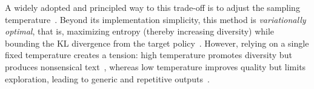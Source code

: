 
A widely adopted and principled way to this trade-off is to adjust the sampling temperature~\citep{ACKLEY1985147, hou2025t1}.
Beyond its implementation simplicity, this method is \emph{variationally optimal}, that is, maximizing entropy (thereby increasing diversity) while bounding the KL divergence from the target policy~\citep{jaynes1957information}.
However, relying on a single fixed temperature creates a tension:
high temperature promotes diversity but produces nonsensical text~\citep{renze-2024-effect, wang2025beyond},
whereas low temperature improves quality but limits exploration, leading to generic and repetitive outputs~\citep{Holtzman2020The, guo2025deepseek}.

